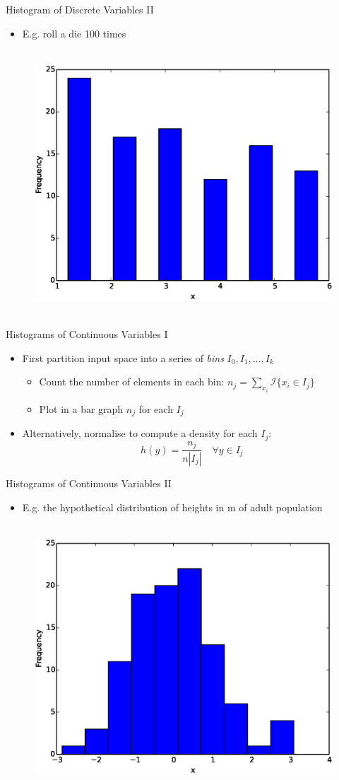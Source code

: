 \documentclass{beamer}
\begin{document}
\begin{frame}{Histogram of Discrete Variables II}
\begin{itemize}
 \item E.g. roll a die 100 times 
\end{itemize}
\begin{figure}[htp]
\mbox{
\includegraphics[width=0.5\linewidth]{DiscreteHist.eps}
}
\end{figure}
\end{frame}

\begin{frame}{Histograms of Continuous Variables I}  
 \begin{itemize} 
  \item First partition input space into a series of \emph{bins} $I_0, I_1, \ldots, I_k$ 
  \begin{itemize} 
  \item Count the number of elements in each bin: $n_j = \sum_{x_i} \mathcal{I}\{x_i \in I_j\}$
  \item Plot in a bar graph $n_j$ for each $I_j$
  \end{itemize} 
  \item Alternatively, normalise to compute a density for each $I_j$: 
  \begin{displaymath} 
    h(y) = \frac{n_j}{n |I_j|} \quad \forall y \in I_j
  \end{displaymath}
 \end{itemize}
\end{frame}

\begin{frame}{Histograms of Continuous Variables II} 
\begin{itemize}
 \item E.g. the hypothetical distribution of heights in m of adult population  
\end{itemize}
\begin{figure}[htp]
\mbox{
\includegraphics[width=0.5\linewidth]{ContinuousHist.eps}
}
\end{figure} 
\end{frame}
\end{document}
